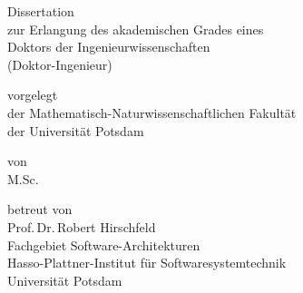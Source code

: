 \begin{titlepage}
  \enlargethispage{2\baselineskip}
  \vspace*{-3.5\baselineskip}
  \begin{center}
    \vspace{2\baselineskip}
    {\huge %
      \makeatletter
      \@title
      \makeatother
    \par
    }
    \vspace{2\baselineskip}

    {\large
      Dissertation\\ 
      zur Erlangung des akademischen Grades eines \\
      Doktors der Ingenieurwissenschaften \\
      (Doktor-Ingenieur)
      \par
      vorgelegt\\
      der Mathematisch-Naturwissenschaftlichen Fakultät\\
      der Universität Potsdam \\
      \par

      \vspace{\baselineskip}

      von \\ 
      M.Sc.\,\makeatletter\@author\makeatother\\
      \par

      \vspace{\baselineskip}

      betreut von\\
      Prof.\,Dr.\,Robert Hirschfeld\\
      Fachgebiet Software-Architekturen\\
      Hasso-Plattner-Institut für Softwaresystemtechnik\\
      Universität Potsdam\\
      \par

      \vfill
      \datemonthname\,\the\year
    }
    \end{center}
\end{titlepage}
\cleardoublepage
